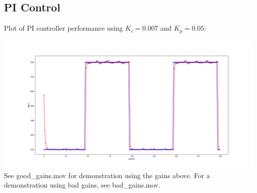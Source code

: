 \documentclass{article}
\begin{document}
\subsection{PI Control}
Plot of PI controller performance using $K_i = 0.007$ and $K_p = 0.05$:

\includegraphics[width=\linewidth]{pi_control_final.png}
See good\_gains.mov for demonstration using the gains above. 
For a demonstration using bad gains, see bad\_gains.mov.
\end{document}
